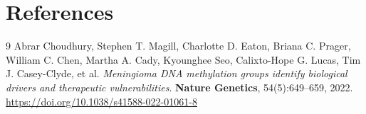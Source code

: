 \documentclass[11pt,a4paper]{article}
\begin{document}
\section*{References}
\begin{thebibliography}{9}
Abrar Choudhury, Stephen T. Magill, Charlotte D. Eaton, Briana C. Prager, William C. Chen, Martha A. Cady, Kyounghee Seo, Calixto-Hope G. Lucas, Tim J. Casey-Clyde, et al.
\textit{Meningioma DNA methylation groups identify biological drivers and therapeutic vulnerabilities}.
\textbf{Nature Genetics}, 54(5):649--659, 2022.
\url{https://doi.org/10.1038/s41588-022-01061-8}
\end{thebibliography}
\end{document}
